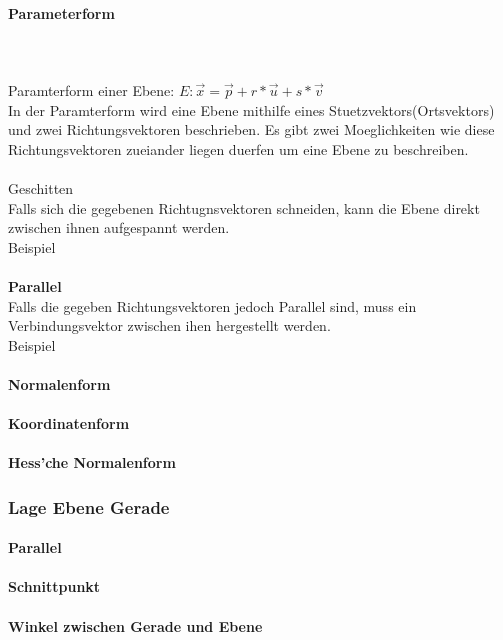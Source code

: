 \documentclass[a4paper]{article} %
\begin{document}
	\paragraph{Parameterform}
		\hspace{0 cm} \\ \noindent \\
	Paramterform einer Ebene: $E : \vec{x} = \vec{p}+ r*\vec{u}+s*\vec{v}$\\
	In der Paramterform wird eine Ebene mithilfe eines Stuetzvektors(Ortsvektors) und zwei Richtungsvektoren beschrieben.
	Es gibt zwei Moeglichkeiten wie diese Richtungsvektoren zueiander liegen duerfen um eine Ebene zu beschreiben.
	\\\\Geschitten\\
	Falls sich die gegebenen Richtugnsvektoren schneiden, kann die Ebene direkt zwischen ihnen aufgespannt werden.
	\\Beispiel
	\\\textbf{\\Parallel}\\
	Falls die gegeben Richtungsvektoren jedoch Parallel sind, muss ein Verbindungsvektor zwischen ihen hergestellt werden.
	\\Beispiel
	\paragraph{Normalenform}
	\paragraph{Koordinatenform}
	\paragraph{Hess'che Normalenform}
	\subsubsection{Lage Ebene Gerade}
	\paragraph{Parallel}
	\paragraph{Schnittpunkt}
	\paragraph{Winkel zwischen Gerade und Ebene}
\end{document}
